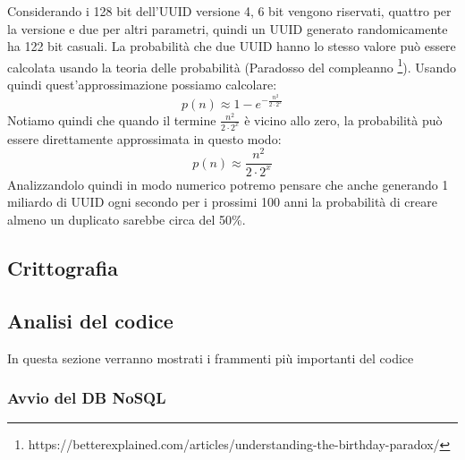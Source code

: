 \hspace{\parindent}Considerando i 128 bit dell'UUID versione 4, 6 bit vengono riservati, quattro per la versione e due per altri parametri, quindi un UUID generato randomicamente ha 122 bit casuali. La probabilità che due UUID hanno lo stesso valore può essere calcolata usando la teoria delle probabilità (Paradosso del compleanno \footnote{https://betterexplained.com/articles/understanding-the-birthday-paradox/}). Usando quindi quest'approssimazione possiamo calcolare:
\begin{equation}
p(n) \approx 1- e^{-\frac{n^2}{2\cdot 2^x}}
\end{equation}
Notiamo quindi che quando il termine $ \frac{n^2}{2\cdot 2^x}$ è vicino allo zero, la probabilità può essere direttamente approssimata in questo modo:
\begin{equation}
p(n) \approx \frac{n^2}{2\cdot 2^x}
\end{equation}
Analizzandolo quindi in modo numerico potremo pensare che anche generando 1 miliardo di UUID ogni secondo per i prossimi 100 anni la probabilità di creare almeno un duplicato sarebbe circa del 50\%.

\subsection{Crittografia}

\subsection{Analisi del codice}
\hspace{\parindent}In questa sezione verranno mostrati i frammenti più importanti del codice
\lstset{style=mystyle}
\subsubsection{Avvio del DB NoSQL}


